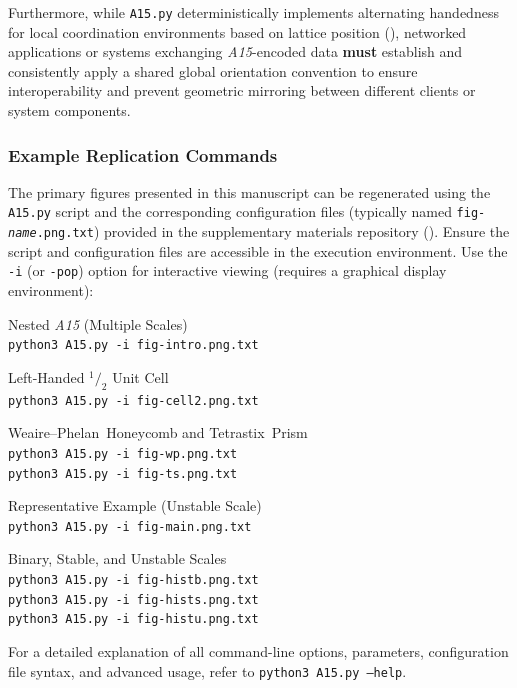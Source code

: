 \documentclass[10pt]{article}
\def\AAAB{\textit{A15}}
\def\WP{Weaire--Phelan}
\def\WPH{\WP{}~Honeycomb}
\def\TSP{Tetrastix~Prism}
\begin{document}
Furthermore, while \texttt{A15.py} deterministically implements alternating handedness for local coordination environments based on lattice position (), networked applications or systems exchanging \AAAB{}-encoded data \textbf{must} establish and consistently apply a shared global orientation convention to ensure interoperability and prevent geometric mirroring between different clients or system components.

\subsubsection{Example Replication Commands}\label{subsubsec-repl-commands}
The primary figures presented in this manuscript can be regenerated using the \texttt{A15.py} script and the corresponding configuration files (typically named \texttt{fig-\textit{name}.png.txt}) provided in the supplementary materials repository (). Ensure the script and configuration files are accessible in the execution environment. Use the \texttt{-i} (or \texttt{-pop}) option for interactive viewing (requires a graphical display environment):

\begin{description} \itemsep0pt
    \item[\Cref{fig-intro} (Intro):] Nested \AAAB{} (Multiple Scales) \\
        \texttt{python3 A15.py -i fig-intro.png.txt}
    \item[\Cref{fig-cell2} (Internals):] Left-Handed $^1/_2$ Unit Cell \\
        \texttt{python3 A15.py -i fig-cell2.png.txt}
    \item[\Cref{fig-wp-ts} (Partitions):] \WPH{} and \TSP{} \\
        \texttt{python3 A15.py -i fig-wp.png.txt} \\
        \texttt{python3 A15.py -i fig-ts.png.txt}
    \item[\Cref{fig-main} (Composite):] Representative Example (Unstable Scale) \\
        \texttt{python3 A15.py -i fig-main.png.txt}
    \item[\Cref{fig-hist} (Histograms):] Binary, Stable, and Unstable Scales \\
        \texttt{python3 A15.py -i fig-histb.png.txt} \\
        \texttt{python3 A15.py -i fig-hists.png.txt} \\
        \texttt{python3 A15.py -i fig-histu.png.txt}
\end{description}
For a detailed explanation of all command-line options, parameters, configuration file syntax, and advanced usage, refer to \texttt{python3 A15.py --help}.
\end{document}
